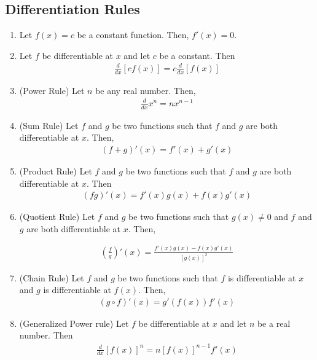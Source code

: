 \documentclass[reqno,psamsfonts]{amsart}
\theoremstyle{definition}
\theoremstyle{remark}
\numberwithin{equation}{section}
\begin{document}
\subsection*{Differentiation Rules}
\begin{enumerate}
\item Let $f(x)= c$ be a constant function. Then, $f'(x) = 0$.
\item Let $f$ be differentiable at $x$ and let $c$ be a constant. Then
\begin{align*}
\frac{d}{dx}[cf(x)]= c\frac{d}{dx}[f(x)]
\end{align*}

\item (Power Rule) Let $n$ be any real number. Then,
\begin{align*}
\frac{d}{dx}x^n=nx^{n-1}
\end{align*}

\item (Sum Rule) Let $f$ and $g$ be two functions such that $f$ and $g$ are both differentiable at $x$. Then,
\begin{align*}
(f+g)'(x) = f'(x)+g'(x)
\end{align*}

\item (Product Rule)
Let $f$ and $g$ be two functions such that $f$ and $g$ are both differentiable at $x$. Then
\begin{align*}
(fg)'(x) = f'(x)g(x)+f(x)g'(x)
\end{align*}

\item (Quotient Rule) Let $f$ and $g$ be two functions such that $g(x)\neq 0$ and $f$ and $g$ are both differentiable at $x$. Then,

\begin{align*}
\left(\frac{f}{g}\right )'(x) = \frac{f'(x)g(x)-f(x)g'(x)}{[g(x)]^2}
\end{align*}

\item (Chain Rule) Let $f$ and $g$ be two functions such that $f$ is differentiable at $x$ and $g$ is differentiable at $f(x)$. Then,
\begin{align*}
(g\circ f)'(x) = g'(f(x))f'(x)
\end{align*}

\item (Generalized Power rule)
Let $f$ be differentiable at $x$ and let $n$ be a real number. Then
\begin{align*}
\frac{d}{dx}[f(x)]^n=n[f(x)]^{n-1}f'(x)
\end{align*}
\end{enumerate}
\end{document}

